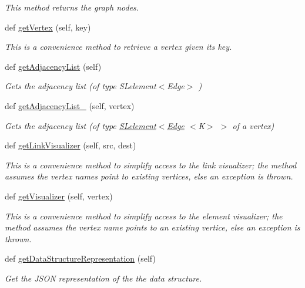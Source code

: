 \begin{DoxyCompactItemize}
\begin{DoxyCompactList}\small\item\em This method returns the graph nodes. \end{DoxyCompactList}\item 
def \hyperlink{class_graph_adj_list_1_1_graph_adj_list_a8f0e2f62373963562f2c28bfb1513bc1}{get\+Vertex} (self, key)
\begin{DoxyCompactList}\small\item\em This is a convenience method to retrieve a vertex given its key. \end{DoxyCompactList}\item 
def \hyperlink{class_graph_adj_list_1_1_graph_adj_list_ae5fe3c73d73d417121b0d3f39d9a6ccf}{get\+Adjacency\+List} (self)
\begin{DoxyCompactList}\small\item\em Gets the adjacency list (of type S\+Lelement$<$\+Edge$>$ ) \end{DoxyCompactList}\item 
def \hyperlink{class_graph_adj_list_1_1_graph_adj_list_ae446e3a3cd1c8e04faf600ac46dbfddc}{get\+Adjacency\+List\+\_} (self, vertex)
\begin{DoxyCompactList}\small\item\em Gets the adjacency list (of type \hyperlink{namespace_s_lelement}{S\+Lelement}$<$\hyperlink{namespace_edge}{Edge} $<$\+K$>$ $>$ of a vertex) \end{DoxyCompactList}\item 
def \hyperlink{class_graph_adj_list_1_1_graph_adj_list_ac8e04d8c44a0a7f117e38215c593845e}{get\+Link\+Visualizer} (self, src, dest)
\begin{DoxyCompactList}\small\item\em This is a convenience method to simplify access to the link visualizer; the method assumes the vertex names point to existing vertices, else an exception is thrown. \end{DoxyCompactList}\item 
def \hyperlink{class_graph_adj_list_1_1_graph_adj_list_ac5526b72818cd4f4f939a42cb173ada3}{get\+Visualizer} (self, vertex)
\begin{DoxyCompactList}\small\item\em This is a convenience method to simplify access to the element visualizer; the method assumes the vertex name points to an existing vertice, else an exception is thrown. \end{DoxyCompactList}\item 
def \hyperlink{class_graph_adj_list_1_1_graph_adj_list_abb989d64385323cd0032c74c85b449fa}{get\+Data\+Structure\+Representation} (self)
\begin{DoxyCompactList}\small\item\em Get the J\+S\+ON representation of the the data structure. \end{DoxyCompactList}\end{DoxyCompactItemize}
